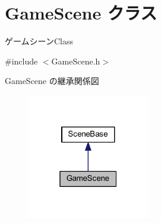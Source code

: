 \hypertarget{class_game_scene}{}\section{Game\+Scene クラス}
\label{class_game_scene}


ゲームシーン\+Class  




{\ttfamily \#include $<$Game\+Scene.\+h$>$}



Game\+Scene の継承関係図\nopagebreak
\begin{figure}[H]
\begin{center}
\leavevmode
\includegraphics[width=151pt]{class_game_scene__inherit__graph}
\end{center}
\end{figure}
